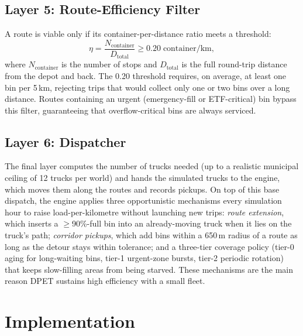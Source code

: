 \documentclass[conference, a4paper]{IEEEtran}
\begin{document}
\subsection{Layer 5: Route-Efficiency Filter}
A route is viable only if its container-per-distance ratio meets a threshold:
\begin{equation}
  \eta = \frac{N_{\text{container}}}{D_{\text{total}}} \geq 0.20 \;\text{container/km},
  \label{eq:efficiency}
\end{equation}
where $N_{\text{container}}$ is the number of stops and $D_{\text{total}}$ is the full round-trip distance from the depot and back. The 0.20 threshold requires, on average, at least one bin per 5\,km, rejecting trips that would collect only one or two bins over a long distance. Routes containing an urgent (emergency-fill or ETF-critical) bin bypass this filter, guaranteeing that overflow-critical bins are always serviced.

\subsection{Layer 6: Dispatcher}
The final layer computes the number of trucks needed (up to a realistic municipal ceiling of 12 trucks per world) and hands the simulated trucks to the engine, which moves them along the routes and records pickups. On top of this base dispatch, the engine applies three opportunistic mechanisms every simulation hour to raise load-per-kilometre without launching new trips: \textit{route extension}, which inserts a $\geq$90\%-full bin into an already-moving truck when it lies on the truck's path; \textit{corridor pickups}, which add bins within a 650\,m radius of a route as long as the detour stays within tolerance; and a three-tier coverage policy (tier-0 aging for long-waiting bins, tier-1 urgent-zone bursts, tier-2 periodic rotation) that keeps slow-filling areas from being starved. These mechanisms are the main reason DPET sustains high efficiency with a small fleet.

\section{Implementation}
\end{document}
